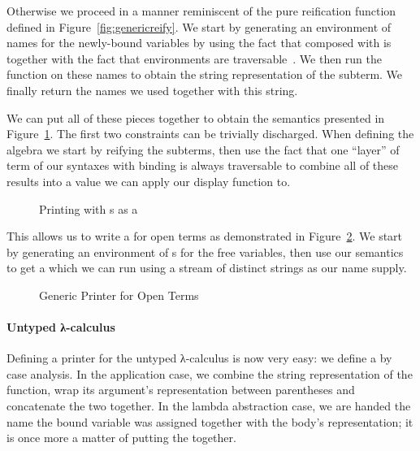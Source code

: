 
Otherwise we proceed in a manner reminiscent of the pure reification function
defined in Figure~\ref{fig:genericreify}. We start by generating an environment
of names for the newly-bound variables by using the fact that  composed
with  is  together with the fact that environments are
traversable~\cite{mcbride_paterson_2008}. We then run the  function
on these names to obtain the string representation of the subterm. We finally
return the names we used together with this string.


We can put all of these pieces together to obtain the  semantics
presented in Figure~\ref{fig:genericprinting}.
The first two constraints can be trivially discharged. When defining the
algebra we start by reifying the subterms, then use the fact that  one ``layer''
of term of our syntaxes with binding is always traversable to combine all of
these results into a value we can apply our display function to.

\begin{figure}[h]
\caption{Printing with s as a }\label{fig:genericprinting}
\end{figure}

This allows us to write a  for open terms as demonstrated in
Figure~\ref{fig:genericprint}. We start by generating
an environment of s for the free variables, then use our semantics
to get a  which we can run using a stream  of distinct
strings as our name supply.

\begin{figure}[h]
\caption{Generic Printer for Open Terms}\label{fig:genericprint}
\end{figure}


\paragraph{Untyped λ-calculus} Defining a printer for the untyped
λ-calculus is now very easy: we define a  by case analysis.
In the application case, we combine the string representation of the
function, wrap its argument's representation between parentheses and
concatenate the two together. In the lambda abstraction case, we are
handed the name the bound variable was assigned together with the body's
representation; it is once more a matter of putting the 
together.

